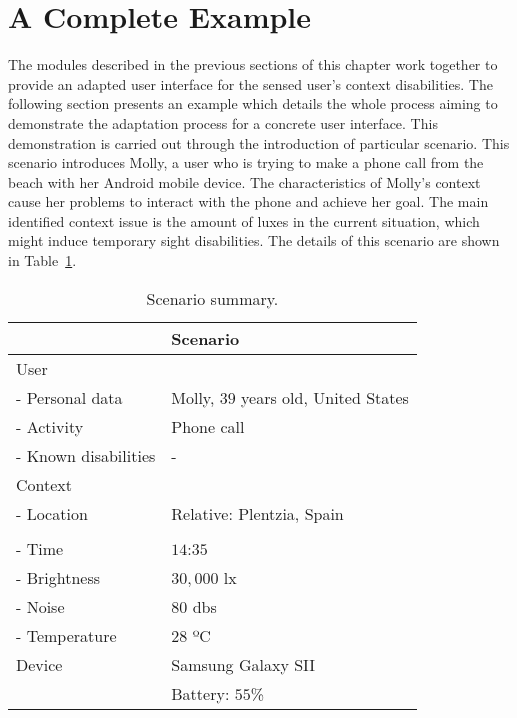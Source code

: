 \section{A Complete Example}
\label{sec:complete_example}

The modules described in the previous sections of this chapter work together to
provide an adapted user interface for the sensed user's context disabilities. 
The following section presents an example which details the whole process aiming
to demonstrate the adaptation process for a concrete user interface. This 
demonstration is carried out through the introduction of particular scenario. 
This scenario introduces Molly, a user who is trying to make a phone call from 
the beach with her Android mobile device. The characteristics of Molly's context 
cause her problems to interact with the phone and achieve her goal. The main 
identified context issue is the amount of luxes in the current situation, which 
might induce temporary sight disabilities. The details of this scenario are shown
in Table~\ref{tbl:example_scenario}.

\begin{table}[H]
 \caption{Scenario summary.}
 \label{tbl:example_scenario}
 \footnotesize
 \centering
\begin{tabular}{l l}
  \hline 
				& \textbf{Scenario}	\\
  \hline
  User \\
  \qquad - Personal data 	& Molly, $39$ years old, United States\\
  \qquad - Activity	 	& Phone call		\\
  \qquad - Known disabilities 	& - 			\\
  Context \\
  \qquad - Location 		& Relative: Plentzia, Spain\\
				& 			\\
  \qquad - Time			& $14$:$35$ 		\\
  \qquad - Brightness		& $30,000$ \ac{lx}	\\
  \qquad - Noise		& $80$ \acp{db}		\\
  \qquad - Temperature		& $28$ ºC 		\\
  Device 			& Samsung Galaxy SII 	\\
				& Battery: $55$\%	\\
  \hline
\end{tabular}
\end{table}

